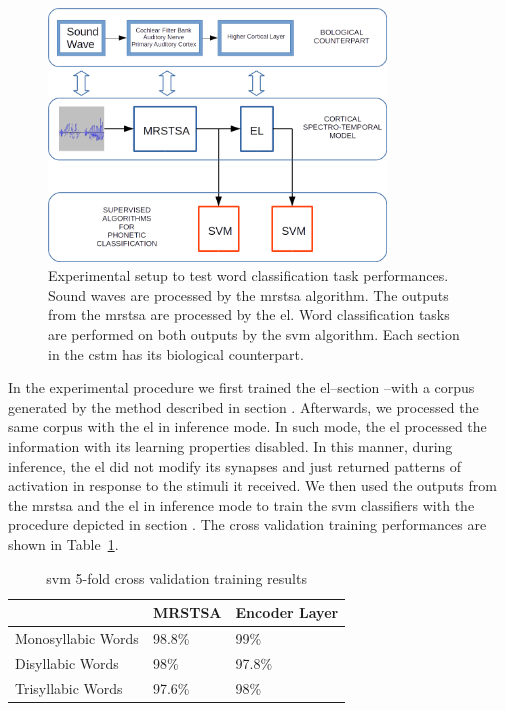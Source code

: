 \documentclass[10pt,letterpaper]{article}
\begin{document}
\begin{figure}[h!]
    \centering
    \includegraphics[width=0.8\textwidth]{Experiment.png}
    \caption{Experimental setup to test word classification task performances.
    Sound waves are processed by the \gls{mrstsa} algorithm.
    The outputs from the \gls{mrstsa} are processed by the \gls{el}.
    Word classification tasks are performed on both outputs by the \gls{svm} algorithm.
    Each section in the \gls{cstm} has its biological counterpart.}
    \label{fig:Experiment}
\end{figure}

\pagebreak

In the experimental procedure we first trained the \gls{el}--section --with a corpus generated by the method described in section . Afterwards, we processed the same corpus with the \gls{el} in inference mode. In such mode, the \gls{el} processed the information with its learning properties disabled. In this manner, during inference, the \gls{el} did not modify its synapses and just returned patterns of activation in response to the stimuli it received. We then used the outputs from the \gls{mrstsa} and the \gls{el} in inference mode to train the \gls{svm} classifiers with the procedure depicted in section . The cross validation training performances are shown in Table~\ref{SVM_Training}.

\begin{table}[h!]
\centering
\caption{\gls{svm} 5-fold cross validation training results}
\begin{tabular}{|l|l|l|}
\hline
                   & MRSTSA & Encoder Layer \\ \hline
Monosyllabic Words & 98.8\% & 99\%          \\ \hline
Disyllabic Words   & 98\%   & 97.8\%        \\ \hline
Trisyllabic Words  & 97.6\% & 98\%          \\ \hline
\end{tabular}
\label{SVM_Training}
\end{table}
\end{document}
